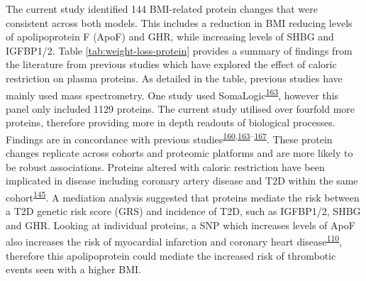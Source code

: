 \documentclass[11pt,twoside]{bristolthesis}
\begin{document}
The current study identified 144 BMI-related protein changes that were consistent across both models. This includes a reduction in BMI reducing levels of apolipoprotein F (ApoF) and GHR, while increasing levels of SHBG and IGFBP1/2. Table \ref{tab:weight-loss-protein} provides a summary of findings from the literature from previous studies which have explored the effect of caloric restriction on plasma proteins. As detailed in the table, previous studies have mainly used mass spectrometry. One study used SomaLogic\textsuperscript{\protect\hyperlink{ref-Carayol2017}{163}}, however this panel only included 1129 proteins. The current study utilised over fourfold more proteins, therefore providing more in depth readouts of biological processes. Findings are in concordance with previous studies\textsuperscript{\protect\hyperlink{ref-Figarska2020}{160},\protect\hyperlink{ref-Carayol2017}{163}--\protect\hyperlink{ref-Bruderer2019}{167}}. These protein changes replicate across cohorts and proteomic platforms and are more likely to be robust associations. Proteins altered with caloric restriction have been implicated in disease including coronary artery disease and T2D within the same cohort\textsuperscript{\protect\hyperlink{ref-Ritchie2019}{145}}. A mediation analysis suggested that proteins mediate the risk between a T2D genetic risk score (GRS) and incidence of T2D, such as IGFBP1/2, SHBG and GHR. Looking at individual proteins, a SNP which increases levels of ApoF also increases the risk of myocardial infarction and coronary heart disease\textsuperscript{\protect\hyperlink{ref-Liu2021}{110}}, therefore this apolipoprotein could mediate the increased risk of thrombotic events seen with a higher BMI.
\end{document}
